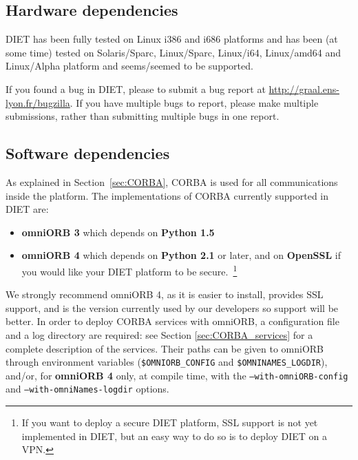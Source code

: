 \subsection{Hardware dependencies}

DIET has been fully tested on Linux i386 and i686 platforms and has 
been (at some time) tested on Solaris/Sparc, Linux/Sparc, Linux/i64,
Linux/amd64 and Linux/Alpha platform and seems/seemed to be supported.

If you found a bug in DIET, please to submit a bug report at
\url{http://graal.ens-lyon.fr/bugzilla}. If you have multiple bugs
to report, please make multiple submissions, rather than submitting
multiple bugs in one report.

\subsection{Software dependencies}

As explained in Section~\ref{sec:CORBA}, CORBA is used for all
communications inside the platform. The implementations of CORBA
currently supported in DIET are:
\begin{itemize}
 \item{\textbf{omniORB 3}} which depends on \textbf{Python 1.5}
 \item{\textbf{omniORB 4}} which depends on \textbf{Python 2.1} or
                           later, and on \textbf{OpenSSL} if you would
                           like your DIET platform to be
                           secure.~\footnote{If you want to deploy a
                           secure DIET platform, SSL support is not
                           yet implemented  in DIET, but an easy way
                           to do so is to deploy DIET on a VPN.}
\end{itemize}
We strongly recommend omniORB 4, as it is easier to install,
provides SSL support, and is the version currently used by our
developers so support will be better. In order to deploy CORBA
services with omniORB, a configuration file and a log directory are
required: see Section
\ref{sec:CORBA_services} for a complete description of the services.
Their paths can be given to omniORB through environment variables
(\texttt{\$OMNIORB\_CONFIG} and \texttt{\$OMNINAMES\_LOGDIR}), and/or,
for \textbf{omniORB 4} only, at compile time, with the
\texttt{--with-omniORB-config} and \texttt{--with-omniNames-logdir}
options.

